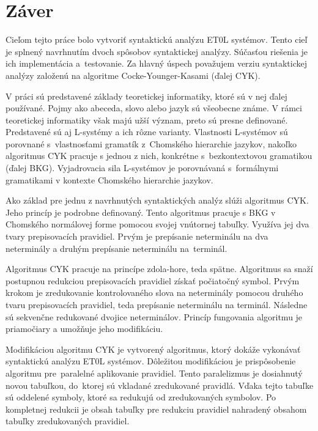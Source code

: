 \label{compare}
\chapter{Záver}
\label{zaver}
Cieľom tejto práce bolo vytvoriť syntaktickú analýzu ET0L systémov. Tento cieľ je splnený navrhnutím dvoch spôsobov syntaktickej analýzy. Súčasťou riešenia je ich implementácia a~testovanie. Za hlavný úspech považujem verziu syntaktickej analýzy založenú na algoritme Cocke-Younger-Kasami (ďalej CYK).

V práci sú predstavené základy teoretickej informatiky, ktoré sú v nej ďalej používané. Pojmy ako abeceda, slovo alebo jazyk sú všeobecne známe. V rámci teoretickej informatiky však majú užší význam, preto sú presne definované. Predstavené sú aj L-systémy a ich rôzne varianty. Vlastnosti L-systémov sú porovnané s~vlastnosťami gramatík z~Chomského hierarchie jazykov, nakoľko algoritmus CYK pracuje s jednou z nich, konkrétne s~bezkontextovou gramatikou (ďalej BKG). Vyjadrovacia sila L-systémov je porovnávaná s~formálnymi gramatikami v kontexte Chomského hierarchie jazykov. 


Ako základ pre jednu z navrhnutých syntaktických analýz slúži algoritmus CYK. Jeho princíp je podrobne definovaný. Tento algoritmus pracuje s BKG v Chomského normálovej forme pomocou svojej vnútornej tabuľky. Využíva jej dva tvary prepisovacích pravidiel. Prvým je prepísanie neterminálu na dva neterminály a druhým prepísanie neterminálu na~terminál.

Algoritmus CYK pracuje na princípe zdola-hore, teda spätne. Algoritmus sa snaží postupnou redukciou prepisovacích pravidiel získať počiatočný symbol. Prvým krokom je zredukovanie kontrolovaného slova na neterminály pomocou druhého tvaru prepisovacích pravidiel, teda prepísanie neterminálu na terminál. Následne sú sekvenčne redukované dvojice neterminálov. Princíp fungovania algoritmu je priamočiary a umožňuje jeho modifikáciu.

Modifikáciou algoritmu CYK je vytvorený algoritmus, ktorý dokáže vykonávať syntaktickú analýzu ET0L systémov. Dôležitou modifikáciou je prispôsobenie algoritmu pre~paralelné aplikovanie pravidiel. Tento paralelizmus je dosiahnutý novou tabuľkou, do~ktorej sú vkladané zredukované pravidlá. Vďaka tejto tabuľke sú oddelené symboly, ktoré sa redukujú od zredukovaných symbolov. Po kompletnej redukcii je obsah tabuľky pre redukciu pravidiel nahradený obsahom tabuľky zredukovaných pravidiel.

